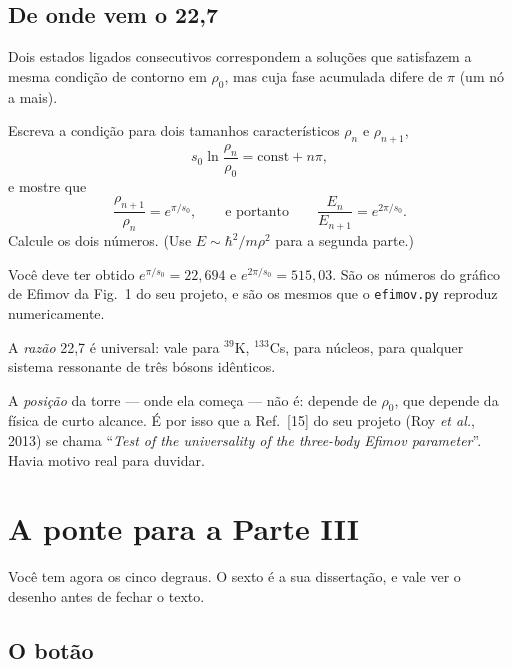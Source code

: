 \documentclass[11pt,a4paper]{article}
\begin{document}
\subsection{De onde vem o 22,7}

\begin{suavez}
Dois estados ligados consecutivos correspondem a soluções que satisfazem a mesma
condição de contorno em $\rho_{0}$, mas cuja fase acumulada difere de $\pi$
(um nó a mais).

Escreva a condição para dois tamanhos característicos $\rho_{n}$ e $\rho_{n+1}$,
\[
s_{0}\ln\frac{\rho_{n}}{\rho_{0}} = \text{const} + n\pi,
\]
e mostre que
\[
\frac{\rho_{n+1}}{\rho_{n}} = e^{\pi/s_{0}},
\qquad\text{e portanto}\qquad
\frac{E_{n}}{E_{n+1}} = e^{2\pi/s_{0}}.
\]
Calcule os dois números. (Use $E \sim \hbar^{2}/m\rho^{2}$ para a segunda parte.)

\vspace{2.6cm}
\hrulefill
\end{suavez}

Você deve ter obtido $e^{\pi/s_{0}} = 22{,}694$ e $e^{2\pi/s_{0}} = 515{,}03$. São os
números do gráfico de Efimov da Fig.~1 do seu projeto, e são os mesmos que o
\texttt{efimov.py} reproduz numericamente.

\begin{atencao}
A \emph{razão} 22,7 é universal: vale para $^{39}$K, $^{133}$Cs, para núcleos, para
qualquer sistema ressonante de três bósons idênticos.

A \emph{posição} da torre --- onde ela começa --- não é: depende de $\rho_{0}$, que
depende da física de curto alcance. É por isso que a Ref.~[15] do seu projeto (Roy
\emph{et al.}, 2013) se chama ``\emph{Test of the universality of the three-body
Efimov parameter}''. Havia motivo real para duvidar.
\end{atencao}

\section{A ponte para a Parte III}

Você tem agora os cinco degraus. O sexto é a sua dissertação, e vale ver o desenho
antes de fechar o texto.

\subsection*{O botão}
\end{document}
